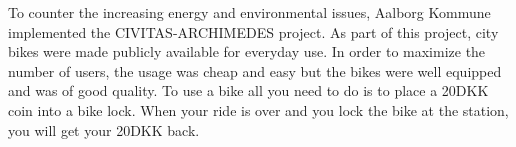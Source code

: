 To counter the increasing energy and environmental issues, Aalborg Kommune implemented the CIVITAS-ARCHIMEDES project\cite{aalborgbycyklenbagcyklen}. As part of this project, city bikes were made publicly available for everyday use.
In order to maximize the number of users, the usage was cheap and easy but the bikes were well equipped and was of good quality\cite{cykelplanlaegning}.
To use a bike all you need to do is to place a 20DKK coin into a bike lock. When your ride is over and you lock the bike at the station, you will get your 20DKK back.
